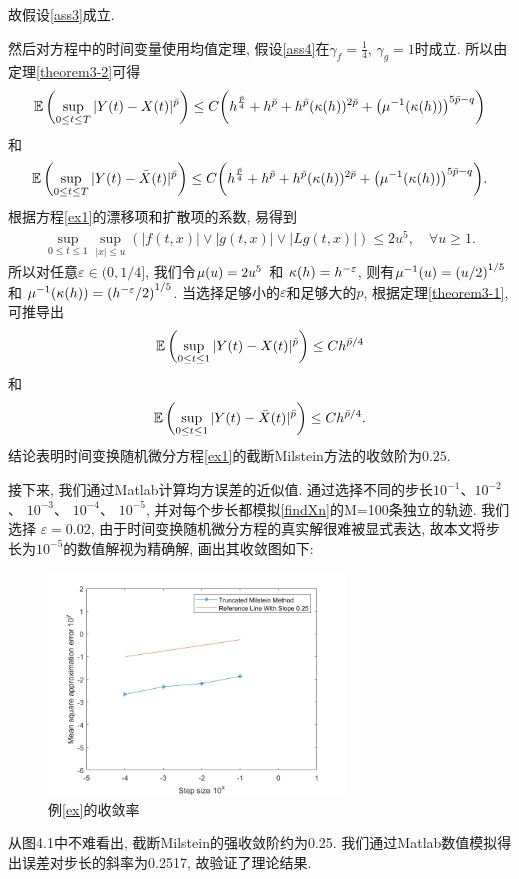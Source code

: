 故假设\ref{ass3}成立.
\par
然后对方程中的时间变量使用均值定理, 假设\ref{ass4}在$\gamma_f=\frac{1}{4}$, $\gamma_g=1$时成立. 所以由定理\ref{theorem3-2}可得
\begin{align*}
    \mathbb{E} \left( \sup_{0\leq t\leq T}|Y(t)-X(t)|^{\bar{p}} \right) \leq C\bigg(h^{\frac{\bar{p}}{4}}+h^{\bar{p}}+h^{\bar{p}}(\kappa(h))^{2\bar{p}}+\big(\mu^{-1}(\kappa(h))\big)^{5\bar{p}-q}\bigg)
\end{align*}
和
\begin{align*}
    \mathbb{E} \left( \sup_{0\leq t\leq T}|Y(t)-\bar{X}(t)|^{\bar{p}} \right) \leq C\bigg(h^{\frac{\bar{p}}{4}}+h^{\bar{p}}+h^{\bar{p}}(\kappa(h))^{2\bar{p}}+\big(\mu^{-1}(\kappa(h))\big)^{5\bar{p}-q}\bigg).
\end{align*}
根据方程\ref{ex1}的漂移项和扩散项的系数, 易得到
\begin{align*}
    \sup_{0\leq t\leq 1}\sup_{|x|\leq u}(|f(t,x)|\vee |g(t,x)|\vee |Lg(t,x)|)\leq 2u^5,\quad  \forall u\geq 1.
\end{align*}
所以对任意$\varepsilon \in (0,1/4]$, 我们令$\mu (u)=2u^5$ 和 $\kappa(h)=h^{-\varepsilon}$, 则有$\mu^{-1}(u)=\left(u/2\right)^{1/5}$和 $\mu^{-1}(\kappa(h))=\left(h^{-\varepsilon}/2\right)^{1/5}$. 当选择足够小的$\varepsilon$和足够大的$p$, 根据定理\ref{theorem3-1},可推导出
\begin{align*}
    \mathbb{E} \left( \sup_{0\leq t\leq 1}|Y(t)-X(t)|^{\bar{p}} \right) \leq Ch^{\bar{p}/4}
\end{align*}
和
\begin{align*}
    \mathbb{E} \left( \sup_{0\leq t\leq 1}|Y(t)-\bar{X}(t)|^{\bar{p}} \right) \leq Ch^{\bar{p}/4}.
\end{align*}
结论表明时间变换随机微分方程\eqref{ex1}的截断Milstein方法的收敛阶为$0.25$.
\par
接下来, 我们通过Matlab计算均方误差的近似值. 通过选择不同的步长$10^{-1}$、$10^{-2}$、 $10^{-3}$、 $10^{-4}$、 $10^{-5}$, 并对每个步长都模拟\eqref{findXn}的M=100条独立的轨迹. 我们选择 $\varepsilon=0.02$, 由于时间变换随机微分方程的真实解很难被显式表达, 故本文将步长为$10^{-5}$的数值解视为精确解, 画出其收敛图如下:
\begin{figure}[H]
    \centering
    \includegraphics[width=0.70\textwidth]{11.jpg}
    \caption{例\ref{ex}的收敛率}
\end{figure}
从图4.1中不难看出, 截断Milstein的强收敛阶约为0.25. 我们通过Matlab数值模拟得出误差对步长的斜率为0.2517, 故验证了理论结果.

